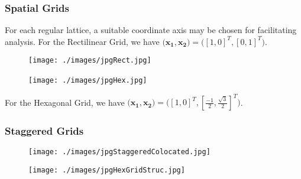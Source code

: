 \documentclass{beamer}
\begin{document}

\begin{frame}
\frametitle{Spatial Grids}

For each regular lattice, a suitable coordinate axis may be chosen for facilitating analysis. 
For the Rectilinear Grid, we have $\big( \mathbf{x_1}, \mathbf{x_2} \big) = \big([1,0]^T, [0,1]^T \big)$.
\begin{figure}
\centering
\begin{minipage}{.5\textwidth}
  \centering
\texttt{[image: ./images/jpgRect.jpg]}
\label{fig:RectilinearGrid}
\end{minipage}%
\begin{minipage}{.5\textwidth}
  \centering
\texttt{[image: ./images/jpgHex.jpg]}
\label{fig:HexGrid}\
\end{minipage}


\end{figure}

For the Hexagonal Grid, we have $\big( \mathbf{x_1}, \mathbf{x_2} \big) = \big([1,0]^T, [\frac{-1}{2},\frac{\sqrt{3}}{2}]^T \big)$.

\end{frame}


\begin{frame}
\frametitle{Staggered Grids}

\begin{figure}
\centering
\begin{minipage}{.5\textwidth}
  \centering
\texttt{[image: ./images/jpgStaggeredColocated.jpg]}
\label{fig:StaggeredColocated}
\end{minipage}%
\begin{minipage}{.5\textwidth}
  \centering
\texttt{[image: ./images/jpgHexGridStruc.jpg]}
\label{fig:HexGridStructure}
\end{minipage}
\end{figure}



\end{frame}
\end{document}
